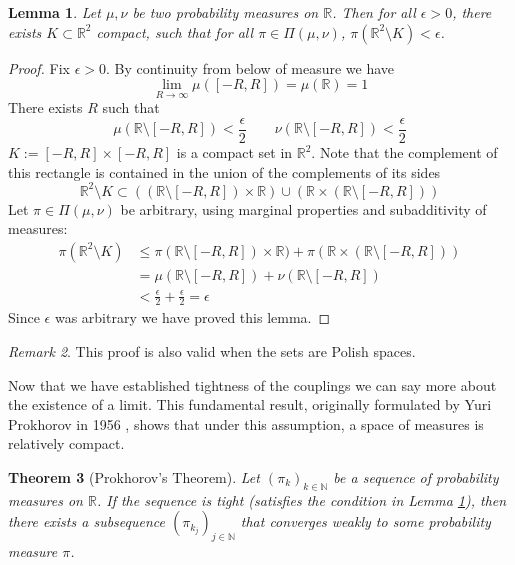 \documentclass[11pt]{amsart}
\newtheorem{theorem}{Theorem}[section]      %
\newtheorem{lemma}[theorem]{Lemma}         %
\theoremstyle{definition}                  %
\theoremstyle{remark}                      %
\newtheorem{remark}[theorem]{Remark}
\begin{document}
\begin{lemma}\label{lemma:tightness}
    Let $\mu, \nu$ be two probability measures on $ \mathbb{R}$. Then for all $\epsilon > 0$,
    there exists $K \subset \mathbb{R}^2$ compact, such that for all $\pi \in \Pi(\mu,\nu)$,
    $\pi( \mathbb{R}^2 \setminus K) < \epsilon$.
\end{lemma}
\begin{proof}
    Fix $\epsilon > 0$.
    By continuity from below of measure we have
    \[
        \lim_{R\to \infty}\mu([-R,R]) = \mu( \mathbb{R}) = 1
    \] 
    There exists $R$ such that 
    \[
        \mu( \mathbb{R} \setminus [-R,R]) < \frac{\epsilon}{2} \qquad \nu( \mathbb{R} \setminus [-R,R]) < \frac{\epsilon}{2}
    \] 
    $K := [-R,R] \times [-R,R]$ is a compact set in  $ \mathbb{R}^2$.
    Note that the complement of this rectangle is contained in the union of the complements of its sides
    \[
        \mathbb{R}^2 \setminus K \subset (( \mathbb{R} \setminus [-R,R]) \times \mathbb{R}) \cup ( \mathbb{R} \times ( \mathbb{R} \setminus [-R,R]))
    \] 
    Let $\pi \in \Pi(\mu,\nu)$ be arbitrary, using marginal properties and subadditivity of measures:
    \begin{align*}
        \pi( \mathbb{R}^2 \setminus K) &\le \pi(\mathbb{R} \setminus [-R,R]) \times \mathbb{R}) + \pi( \mathbb{R} \times ( \mathbb{R} \setminus [-R,R]))\\
                                       &= \mu( \mathbb{R} \setminus [-R,R]) + \nu( \mathbb{R} \setminus [-R,R])\\
                                       &< \frac{\epsilon}{2} + \frac{\epsilon}{2} = \epsilon
    \end{align*}
    Since $\epsilon$ was arbitrary we have proved this lemma.
\end{proof}
\begin{remark}
    This proof is also valid when the sets are Polish spaces.
\end{remark}

Now that we have established tightness of the couplings we can say more about the existence of a limit.
This fundamental result, originally formulated by Yuri Prokhorov in 1956 \citep{prokhorov1956convergence}, shows that under this assumption, a space of measures is relatively compact. 
\begin{theorem}[Prokhorov's Theorem]\label{thm:prokhorov}
    Let $(\pi_k)_{k \in \mathbb{N}}$ be a sequence of probability measures on $\mathbb{R}$. If the sequence is tight (satisfies the condition in Lemma \ref{lemma:tightness}), then there exists a subsequence $(\pi_{k_j})_{j \in \mathbb{N}}$ that converges weakly to some probability measure $\pi$.
\end{theorem}
\end{document}
